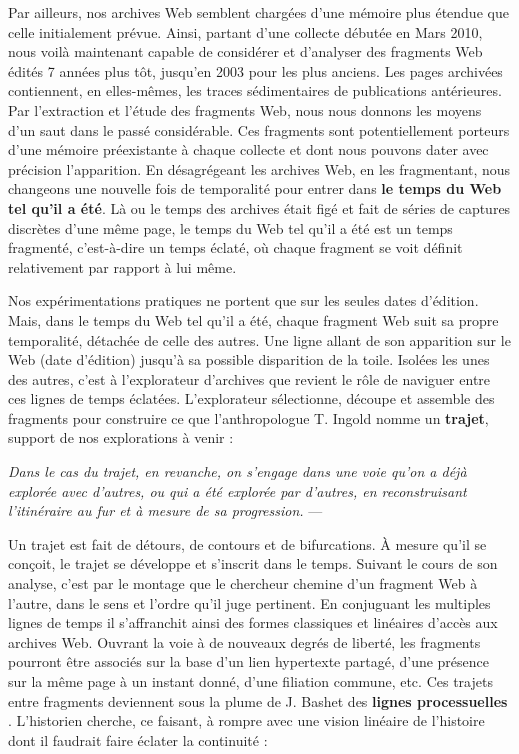 \documentclass[symmetric,justified,marginals=raggedouter]{tufte-book}
\begin{document}
Par ailleurs, nos archives Web semblent chargées d'une mémoire plus étendue que celle initialement prévue. Ainsi, partant d'une collecte débutée en Mars 2010, nous voilà maintenant capable de considérer et d'analyser des fragments Web édités 7 années plus tôt, jusqu'en 2003 pour les plus anciens. Les pages archivées contiennent, en elles-mêmes, les traces sédimentaires de publications antérieures.\\

\noindent Par l'extraction et l'étude des fragments Web, nous nous donnons les moyens d'un saut dans le passé considérable. Ces fragments sont potentiellement porteurs d'une mémoire préexistante à chaque collecte et dont nous pouvons dater avec précision l'apparition. En désagrégeant les archives Web, en les fragmentant, nous changeons une nouvelle fois de temporalité pour entrer dans \textbf{le temps du Web tel qu'il a été}. Là ou le temps des archives était figé et fait de séries de captures discrètes d'une même page, le temps du Web tel qu'il a été est un temps fragmenté, c'est-à-dire un temps éclaté, où chaque fragment se voit définit relativement par rapport à lui même.

Nos expérimentations pratiques ne portent que sur les seules dates d'édition. Mais, dans le temps du Web tel qu'il a été, chaque fragment Web suit sa propre temporalité, détachée de celle des autres. Une ligne allant de son apparition sur le Web (date d'édition) jusqu'à sa possible disparition de la toile. Isolées les unes des autres, c'est à l'explorateur d'archives que revient le rôle de naviguer entre ces lignes de temps éclatées. L'explorateur sélectionne, découpe et assemble des fragments pour construire ce que l'anthropologue T. Ingold nomme un \textbf{trajet}, support de nos explorations à venir : \\ 

\begin{fullwidth}
\og\textit{Dans le cas du trajet, en revanche, on s'engage dans une voie qu'on a déjà explorée avec d’autres, ou qui a été explorée par d'autres, en reconstruisant l'itinéraire au fur et à mesure de sa progression.}\fg{} --- \citep[p.26]{ingold_breve_2013}\\
\end{fullwidth} 

\noindent Un trajet est fait de détours, de contours et de bifurcations. À mesure qu'il se conçoit, le trajet se développe et s'inscrit dans le temps. Suivant le cours de son analyse, c'est par le montage que le chercheur chemine d'un fragment Web à l'autre, dans le sens et l'ordre qu'il juge pertinent. En conjuguant les multiples lignes de temps il s'affranchit ainsi des formes classiques et linéaires d'accès aux archives Web. Ouvrant la voie à de nouveaux degrés de liberté, les fragments pourront être associés sur la base d'un lien hypertexte partagé, d'une présence sur la même page à un instant donné, d'une filiation commune, etc. Ces trajets entre fragments deviennent sous la plume de J. Bashet des \textbf{lignes processuelles} \citep[p.227]{baschet_defaire_2018}. L'historien cherche, ce faisant, à rompre avec une vision linéaire de l'histoire dont il faudrait faire éclater la continuité : \\
\end{document}
